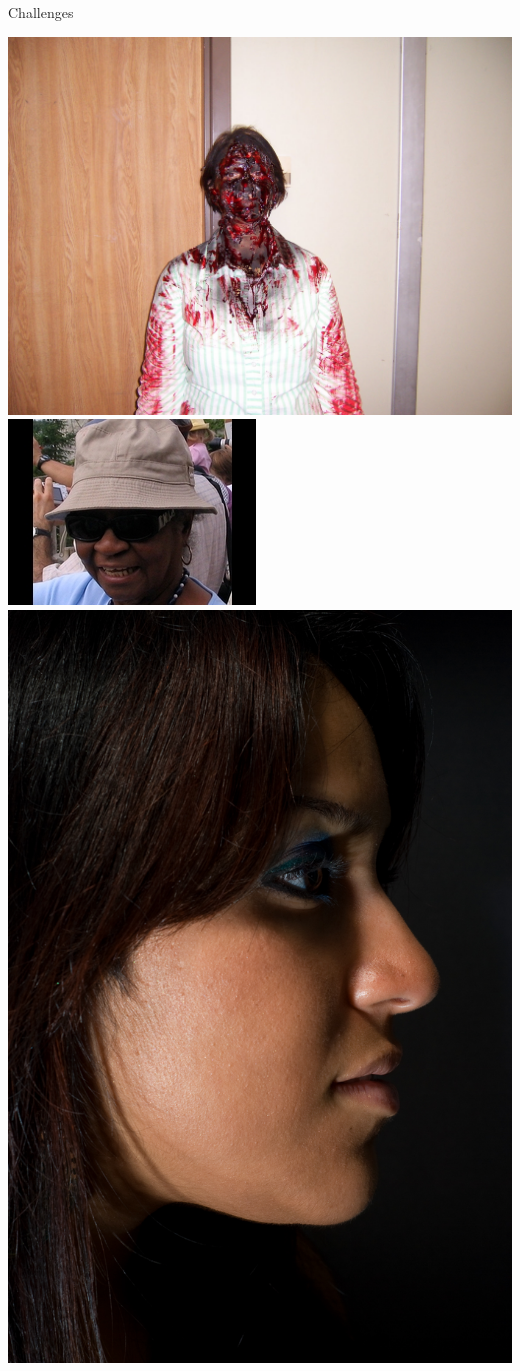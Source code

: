 \begin{xpsectionbox}{Challenges}{}
\begin{minipage}{0.55\linewidth}
\begin{center}
			\includegraphics[height=0.22\linewidth]{images/HEPL_occlusion}
			\includegraphics[height=0.22\linewidth]{images/HEPL_sunglasses_hat}
			\includegraphics[height=0.22\linewidth]{images/AFLW_profile_dark}
\end{center}
\end{minipage}

\end{xpsectionbox}

